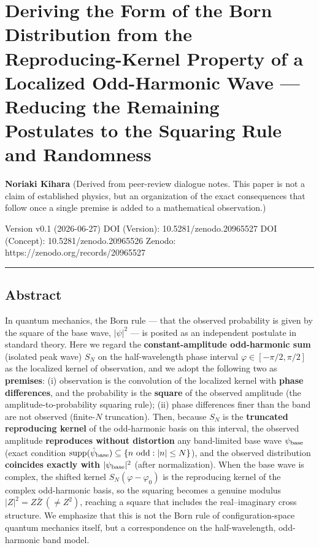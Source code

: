 \documentclass[
]{ltjsarticle}
\author{}
\date{}
\begin{document}
\section{Deriving the Form of the Born Distribution from the
Reproducing-Kernel Property of a Localized Odd-Harmonic Wave ---
Reducing the Remaining Postulates to the Squaring Rule and
Randomness}\label{deriving-the-form-of-the-born-distribution-from-the-reproducing-kernel-property-of-a-localized-odd-harmonic-wave-reducing-the-remaining-postulates-to-the-squaring-rule-and-randomness}

\textbf{Noriaki Kihara} (Derived from peer-review dialogue notes. This
paper is not a claim of established physics, but an organization of the
exact consequences that follow once a single premise is added to a
mathematical observation.)

Version v0.1 (2026-06-27) DOI (Version): 10.5281/zenodo.20965527 DOI
(Concept): 10.5281/zenodo.20965526 Zenodo:
https://zenodo.org/records/20965527

\begin{center}\rule{0.5\linewidth}{0.5pt}\end{center}

\subsection{Abstract}\label{abstract}

In quantum mechanics, the Born rule --- that the observed probability is
given by the square of the base wave, \(|\psi|^2\) --- is posited as an
independent postulate in standard theory. Here we regard the
\textbf{constant-amplitude odd-harmonic sum} (isolated peak wave)
\(S_N\) on the half-wavelength phase interval
\(\varphi\in[-\pi/2,\pi/2]\) as the localized kernel of observation, and
we adopt the following two as \textbf{premises}: (i) observation is the
convolution of the localized kernel with \textbf{phase differences}, and
the probability is the \textbf{square} of the observed amplitude (the
amplitude-to-probability squaring rule); (ii) phase differences finer
than the band are not observed (finite-\(N\) truncation). Then, because
\(S_N\) is the \textbf{truncated reproducing kernel} of the odd-harmonic
basis on this interval, the observed amplitude \textbf{reproduces
without distortion} any band-limited base wave \(\psi_{\rm base}\)
(exact condition
\(\mathrm{supp}(\hat\psi_{\rm base})\subseteq\{n\ \text{odd}:|n|\le N\}\)),
and the observed distribution \textbf{coincides exactly with
\(|\psi_{\rm base}|^2\)} (after normalization). When the base wave is
complex, the shifted kernel \(S_N(\varphi-\varphi_0)\) is the
reproducing kernel of the complex odd-harmonic basis, so the squaring
becomes a genuine modulus \(|Z|^2=Z\bar Z\ (\ne Z^2)\), reaching a
square that includes the real--imaginary cross structure. We emphasize
that this is not the Born rule of configuration-space quantum mechanics
itself, but a correspondence on the half-wavelength, odd-harmonic band
model.
\end{document}
